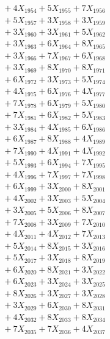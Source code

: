 \documentclass[a4paper,10pt]{article}
\begin{document}
{\begin{align}
&\;  + 4 X_{1954} + 5 X_{1955} + 7 X_{1956} \\[0.3ex]
&\;  + 5 X_{1957} + 3 X_{1958} + 3 X_{1959} \\[0.5ex]\allowbreak
&\;  + 3 X_{1960} + 3 X_{1961} + 5 X_{1962} \\[0.3ex]
&\;  + 3 X_{1963} + 6 X_{1964} + 8 X_{1965} \\[0.3ex]
&\;  + 3 X_{1966} + 7 X_{1967} + 6 X_{1968} \\[0.3ex]
&\;  + 3 X_{1969} + 8 X_{1970} + 8 X_{1971} \\[0.3ex]
&\;  + 6 X_{1972} + 3 X_{1973} + 5 X_{1974} \\[0.3ex]
&\;  + 4 X_{1975} + 6 X_{1976} + 4 X_{1977} \\[0.3ex]
&\;  + 7 X_{1978} + 6 X_{1979} + 5 X_{1980} \\[0.3ex]
&\;  + 7 X_{1981} + 6 X_{1982} + 5 X_{1983} \\[0.3ex]
&\;  + 3 X_{1984} + 4 X_{1985} + 6 X_{1986} \\[0.3ex]
&\;  + 6 X_{1987} + 8 X_{1988} + 4 X_{1989} \\[0.5ex]\allowbreak
&\;  + 7 X_{1990} + 4 X_{1991} + 4 X_{1992} \\[0.3ex]
&\;  + 5 X_{1993} + 6 X_{1994} + 7 X_{1995} \\[0.3ex]
&\;  + 4 X_{1996} + 7 X_{1997} + 7 X_{1998} \\[0.3ex]
&\;  + 6 X_{1999} + 3 X_{2000} + 8 X_{2001} \\[0.3ex]
&\;  + 4 X_{2002} + 3 X_{2003} + 5 X_{2004} \\[0.3ex]
&\;  + 3 X_{2005} + 5 X_{2006} + 8 X_{2007} \\[0.3ex]
&\;  + 7 X_{2008} + 3 X_{2009} + 7 X_{2010} \\[0.3ex]
&\;  + 4 X_{2011} + 4 X_{2012} + 7 X_{2013} \\[0.3ex]
&\;  + 5 X_{2014} + 8 X_{2015} + 3 X_{2016} \\[0.3ex]
&\;  + 5 X_{2017} + 3 X_{2018} + 8 X_{2019} \\[0.5ex]\allowbreak
&\;  + 6 X_{2020} + 8 X_{2021} + 3 X_{2022} \\[0.3ex]
&\;  + 6 X_{2023} + 3 X_{2024} + 3 X_{2025} \\[0.3ex]
&\;  + 8 X_{2026} + 3 X_{2027} + 3 X_{2028} \\[0.3ex]
&\;  + 3 X_{2029} + 6 X_{2030} + 8 X_{2031} \\[0.3ex]
&\;  + 4 X_{2032} + 8 X_{2033} + 8 X_{2034} \\[0.3ex]
&\;  + 7 X_{2035} + 7 X_{2036} + 4 X_{2037} \\[0.3ex]

\end{align}}
\end{document}
